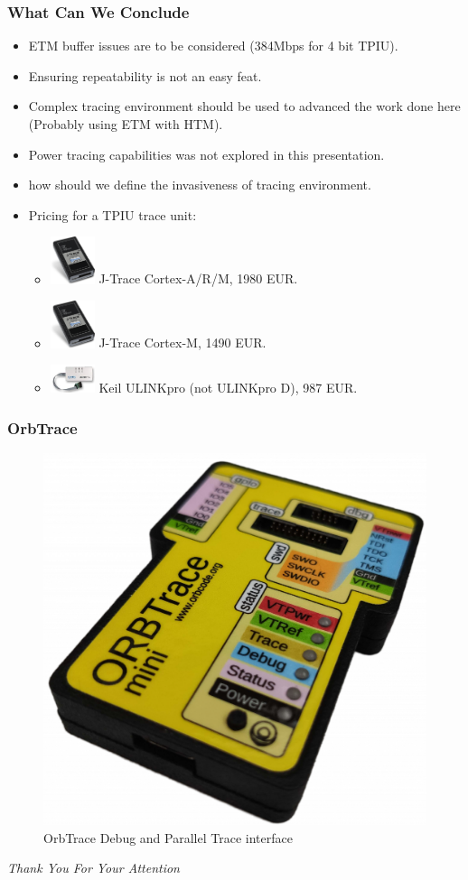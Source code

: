 \documentclass{beamer}
\begin{document}
\begin{frame}
    \frametitle{What Can We Conclude}
    \begin{itemize}
        \item ETM buffer issues are to be considered (384Mbps for 4 bit TPIU).
        \item Ensuring repeatability is not an easy feat.
        \item Complex tracing environment should be used to advanced the work
            done here (Probably using ETM with HTM). 
        \item Power tracing capabilities was not explored in this presentation.
        \item how should we define the invasiveness of tracing environment.
        \item Pricing for a TPIU trace unit:
            \begin{itemize}
                \item \includegraphics[width=1.3cm,valign=c]{jtraceARM.png} J-Trace Cortex-A/R/M, 1980 EUR.
                \item \includegraphics[width=1.3cm,valign=c]{jtraceM.png} J-Trace Cortex-M, 1490 EUR.
                \item \includegraphics[width=1.3cm,valign=c]{ulink.jpeg} Keil ULINKpro (not ULINKpro D), 987 EUR.
            \end{itemize}
    \end{itemize}
\end{frame}

\begin{frame}
    \frametitle{OrbTrace}
    \begin{figure}
        \centering
        \includegraphics[width=0.5\columnwidth]{orbtrace.png}
        \caption{OrbTrace Debug and Parallel Trace interface}
        \label{fig:orbtrace}
    \end{figure}
\end{frame}

\begin{frame}
  \centering \Large
  \emph{Thank You For Your Attention}
\end{frame}
\end{document}
